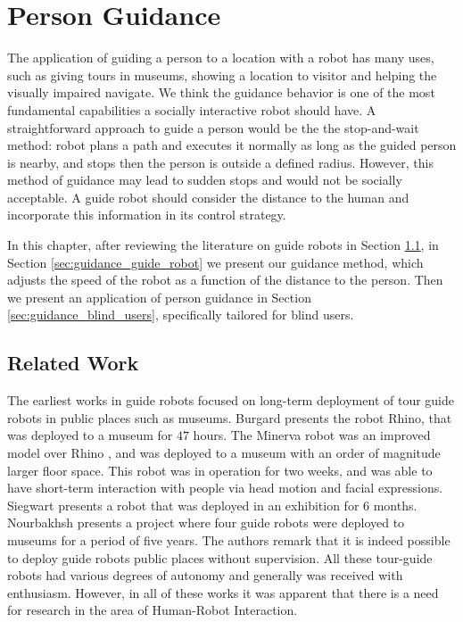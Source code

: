 \chapter{Person Guidance}
\label{chapter:person_guidance}

The application of guiding a person to a location with a robot has many uses, such as giving tours in museums, showing a location to visitor and helping the visually impaired navigate. We think the guidance behavior is one of the most fundamental capabilities a socially interactive robot should have. A straightforward approach to guide a person would be the the stop-and-wait method: robot plans a path and executes it normally as long as the guided person is nearby, and stops then the person is outside a defined radius. However, this method of guidance may lead to sudden stops and would not be socially acceptable. A guide robot should consider the distance to the human and incorporate this information in its control strategy.

In this chapter, after reviewing the literature on guide robots in Section \ref{sec:guidance_related_work}, in Section \ref{sec:guidance_guide_robot} we present our guidance method, which adjusts the speed of the robot as a function of the distance to the person. Then we present an application of person guidance in Section \ref{sec:guidance_blind_users}, specifically tailored for blind users.

\section{Related Work}
\label{sec:guidance_related_work}

The earliest works in guide robots focused on long-term deployment of tour guide robots in public places such as museums. Burgard \cite{burgard1998interactive} presents the robot Rhino, that was deployed to a museum for $47$ hours. The Minerva robot was an improved model over Rhino \cite{thrun1999minerva}, and was deployed to a museum with an order of magnitude larger floor space. This robot was in operation for two weeks, and was able to have short-term interaction with people via head motion and facial expressions. Siegwart \cite{siegwart2003robox} presents a robot that was deployed in an exhibition for 6 months. Nourbakhsh \cite{nourbakhsh2003mobot} presents a project where four guide robots were deployed to museums for a period of five years. The authors remark that it is indeed possible to deploy guide robots public places without supervision. All these tour-guide robots had various degrees of autonomy and generally was received with enthusiasm. However, in all of these works it was apparent that there is a need for research in the area of Human-Robot Interaction.

